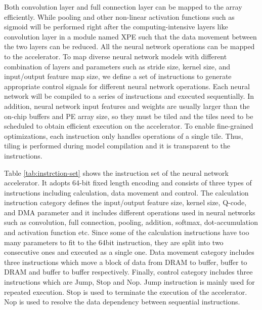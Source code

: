 Both convolution layer and full connection layer can be mapped to the 
array efficiently. While pooling and other non-linear activation functions 
such as sigmoid will be performed right after the computing-intensive 
layers like convolution layer in a module named XPE such that 
the data movement between the two layers can be reduced. 
All the neural network operations can be mapped to the 
accelerator. To map diverse neural network models with different 
combination of layers and parameters such as 
stride size, kernel size, and input/output feature map size, we define 
a set of instructions to generate appropriate control signals 
for different neural network operations. Each neural network 
will be compiled to a series of instructions and executed sequentially. 
In addition, neural network input features and weights 
are usually larger than the on-chip buffers and PE array size, 
so they must be tiled and the tiles need to be scheduled to 
obtain efficient execution on the accelerator. To enable fine-grained 
optimizations, each instruction only handles operations of 
a single tile. Thus, tiling is performed during model
compilation and it is transparent to the instructions.

Table \ref{tab:instrction-set} shows the instruction set of the neural 
network accelerator. It adopts 64-bit fixed length encoding 
and consists of three types of instructions including calculation, 
data movement and control. The calculation instruction  
category defines the input/output feature size, kernel size, 
Q-code, and DMA parameter and it includes different operations 
used in neural networks such as convolution, full connection, 
pooling, addition, softmax, dot-accumulation and activation 
function etc. Since some of the calculation instructions have too 
many parameters to fit to the 64bit instruction, they are split 
into two consecutive ones and executed as a single one. 
Data movement category includes three instructions which move a block of data 
from DRAM to buffer, buffer to DRAM and buffer to buffer 
respectively. Finally, control category includes three instructions which are 
Jump, Stop and Nop. Jump instruction is mainly used for repeated 
execution. Stop is used to terminate the execution of the accelerator.
Nop is used to resolve the data dependency between sequential 
instructions.

